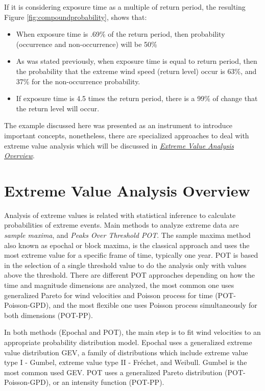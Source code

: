 \documentclass[12pt,twoside]{reedthesis}
\providecommand{\tightlist}{%
  \setlength{\itemsep}{0pt}\setlength{\parskip}{0pt}}
\begin{document}
If it is considering exposure time as a multiple of return period, the resulting Figure \ref{fig:compoundprobability}, shows that:
\begin{itemize}
\tightlist
\item
  When exposure time is .69\% of the return period, then probability (occurrence and non-occurrence) will be 50\%
\item
  As was stated previously, when exposure time is equal to return period, then the probability that the extreme wind speed (return level) occur is 63\%, and 37\% for the non-occurrence probability.
\item
  If exposure time is 4.5 times the return period, there is a 99\% of change that the return level will occur.
\end{itemize}
The example discussed here was presented as an instrument to introduce important concepts, nonetheless, there are specialized approaches to deal with extreme value analysis which will be discussed in \emph{\protect\hyperlink{extremeoverview}{Extreme Value Analysis Overview}}.

\hypertarget{extremeoverview}{%
\section{Extreme Value Analysis Overview}\label{extremeoverview}}

Analysis of extreme values is related with statistical inference to calculate probabilities of extreme events. Main methods to analyze extreme data are \emph{sample maxima}, and \emph{Peaks Over Threshold POT}. The sample maxima method also known as epochal or block maxima, is the classical approach and uses the most extreme value for a specific frame of time, typically one year. POT is based in the selection of a single threshold value to do the analysis only with values above the threshold. There are different POT approaches depending on how the time and magnitude dimensions are analyzed, the most common one uses generalized Pareto for wind velocities and Poisson process for time (POT-Poisson-GPD), and the most flexible one uses Poisson process simultaneously for both dimensions (POT-PP).

In both methods (Epochal and POT), the main step is to fit wind velocities to an appropriate probability distribution model. Epochal uses a generalized extreme value distribution GEV, a family of distributions which include extreme value type I - Gumbel, extreme value type II - Fréchet, and Weibull. Gumbel is the most common used GEV. POT uses a generalized Pareto distribution (POT-Poisson-GPD), or an intensity function (POT-PP).
\end{document}

